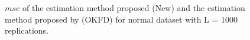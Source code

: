 \documentclass[]{interact}
\theoremstyle{plain}%
\theoremstyle{definition}
\theoremstyle{remark}
\begin{document}
\begin{figure}[htbp]
  \caption{$mse$ of the estimation method proposed (New) and the estimation method proposed by \cite{giraldo2011ordinary} (OKFD) for normal dataset with L = 1000 replications.}
\end{figure}

\begin{figure}[htbp]

\end{figure}
\end{document}
